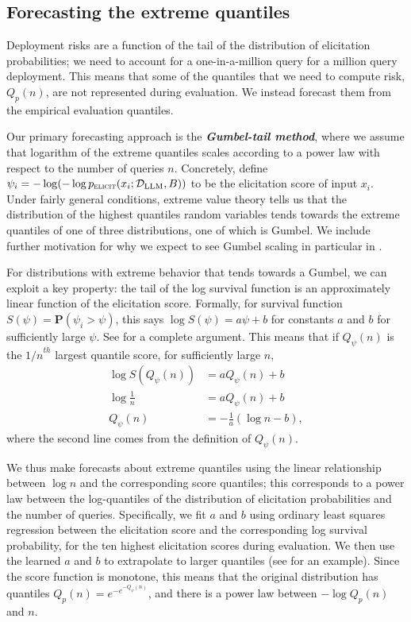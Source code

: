 \subsection{Forecasting the extreme quantiles}
\label{sec:forecasting-extreme-quantiles}
Deployment risks are a function of the tail of the distribution of elicitation probabilities; we need to account for a one-in-a-million query for a million query deployment. This means that some of the quantiles that we need to compute risk, $Q_p(n)$, are not represented during evaluation. 
We instead forecast them from the empirical evaluation quantiles. 

Our primary forecasting approach is the \textbf{\emph{Gumbel-tail method}}, where we assume that logarithm of the extreme quantiles scales according to a power law with respect to the number of queries $n$. Concretely, define $\psi_i = -\log (-\log p_{\textsc{elicit}}(x_i; \mathcal{D}_\text{LLM}, B))$ to be the elicitation score of input $x_i$. Under fairly general conditions, extreme value theory tells us that the distribution of the highest quantiles random variables tends towards the extreme quantiles of one of three distributions, one of which is Gumbel. We include further motivation for why we expect to see Gumbel scaling in particular in .

For distributions with extreme behavior that tends towards a Gumbel, we can exploit a key property: the tail of the log survival function is an approximately linear function of the elicitation score. Formally, for survival function $S(\psi) = \mathbf{P}(\psi_i > \psi)$, this says $\log S(\psi) = a\psi + b$ for constants $a$ and $b$ for sufficiently large $\psi$. See  for a complete argument. 
This means that if $Q_\psi(n)$ is the ${1/n}^{th}$ largest quantile score, for sufficiently large $n$, 
\begin{align}
    \log S(Q_\psi(n)) &= aQ_\psi(n) + b \\ 
    \log \frac{1}{n} &= aQ_\psi(n) + b \\ 
    Q_\psi(n) &= -\frac{1}{a}(\log n  - b),
\end{align}
where the second line comes from the definition of $Q_\psi(n)$. 

We thus make forecasts about extreme quantiles using the linear relationship between $\log n$ and the corresponding score quantiles; this corresponds to a power law between the log-quantiles of the distribution of elicitation probabilities and the number of queries. Specifically, we fit $a$ and $b$ using ordinary least squares regression between the elicitation score and the corresponding log survival probability, for the ten highest elicitation scores during evaluation. We then use the learned $a$ and $b$ to extrapolate to larger quantiles (see  for an example). Since the score function is monotone, this means that the original distribution has quantiles $Q_p(n) = e^{-e^{-Q_\psi(n)}}$, and there is a power law between $-\log Q_p(n)$ and $n$. 

